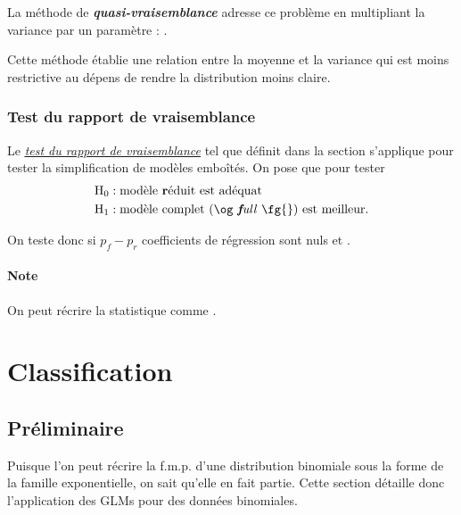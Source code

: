 \documentclass[french]{article}
\begin{document}
\begin{multicols*}{2}
La méthode de \textbf{\textit{quasi-vraisemblance}} adresse ce problème en multipliant la variance par un paramètre  : . 

\bigskip

Cette méthode établie une relation entre la moyenne et la variance qui est moins restrictive au dépens de rendre la distribution moins claire.


\subsubsection{Test du rapport de vraisemblance}
Le \textit{\color{bleudefrance}\underline{\hyperlink{TRVDef}{\color{bleudefrance} test du rapport de vraisemblance}}} tel que définit dans la section \textit{\underline{}} s'applique pour tester la simplification de modèles emboîtés. On pose que  pour tester 
\begin{align*}
	\mathrm{H}_{0}	&:	\text{modèle \textbf{r}éduit est adéquat}	\\
	\mathrm{H}_{1}	&:	\text{modèle complet (\og \textit{\textbf{f}ull} \fg{}) est meilleur}.
\end{align*}

On teste donc si $p_{f} - p_{r}$ coefficients de régression sont nuls et . 

\paragraph{Note}	On peut récrire la statistique comme .



\newpage
\section{Classification}\label{sec:classification}
\subsection{Préliminaire}
\begin{rappel_enhanced}[Contexte]
Puisque l'on peut récrire la f.m.p. d'une distribution binomiale sous la forme de la famille exponentielle, on sait qu'elle en fait partie. Cette section détaille donc l'application des GLMs pour des données binomiales.
\end{rappel_enhanced}


\end{multicols*}
\end{document}
